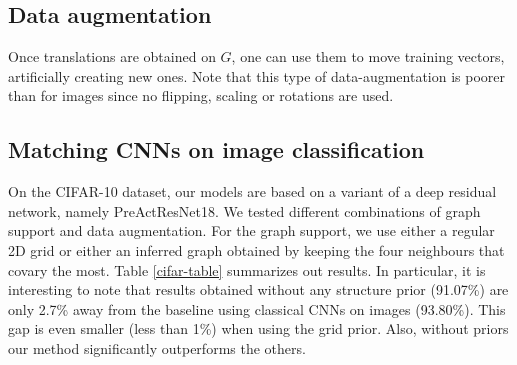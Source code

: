 \subsection{Data augmentation}

Once translations are obtained on $G$, one can use them to move training vectors, artificially creating new ones. Note that this type of data-augmentation is poorer than for images since no flipping, scaling or rotations are used.

\subsection{Matching CNNs on image classification}

On the CIFAR-10 dataset, our models are based on a variant of a deep residual network, namely PreActResNet18\cite{he2016identity}. We tested different combinations of graph support and data augmentation. For the graph support, we use either a regular 2D grid or either an inferred graph obtained by keeping the four neighbours that covary the most. Table \ref{cifar-table} summarizes out results. In particular, it is interesting to note that results obtained without any structure prior (91.07\%) are only 2.7\% away from the baseline using classical CNNs on images (93.80\%). This gap is even smaller (less than 1\%) when using the grid prior. Also, without priors our method significantly outperforms the others. %

